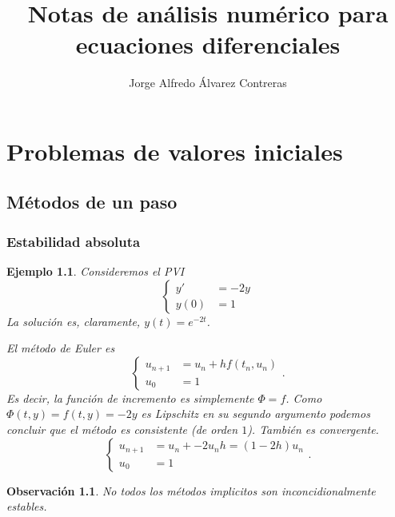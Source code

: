 \documentclass[11pt,letterpaper]{report}
\title{Notas de análisis numérico para ecuaciones diferenciales}
\author{Jorge Alfredo Álvarez Contreras}
\newtheorem{example}{Ejemplo}
\newtheorem{remark}{Observación}
\begin{document}
\maketitle
\tableofcontents

\chapter{Problemas de valores iniciales}

\section{Métodos de un paso}

\subsection{Estabilidad absoluta}

\begin{example}
  Consideremos el PVI
  \begin{equation}
    \left\{
    \begin{aligned}
      y' &= -2y \\
      y(0) &= 1
    \end{aligned}
    \right.
  \end{equation}
  La solución es, claramente, $y(t)=e^{-2t}$.

  El método de Euler es
  \begin{equation}
    \left\{
    \begin{aligned}
      u_{n+1} &= u_n + hf(t_n,u_n) \\
      u_0 &= 1
    \end{aligned}
    \right.
  .\end{equation}
  Es decir, la función de incremento es simplemente $\Phi=f$.
  Como $\Phi(t,y)=f(t,y)=-2y$ es Lipschitz en su segundo argumento
  podemos concluir que el método es consistente (de orden $1$).
  También es convergente.
  \begin{equation}
    \left\{
    \begin{aligned}
      u_{n+1} &= u_n + -2u_nh = (1-2h)u_n \\
      u_0 &= 1
    \end{aligned}
    \right.
  .\end{equation}
  

\end{example}

\begin{remark}
  No todos los métodos implicitos son inconcidionalmente estables.
\end{remark}
\end{document}
